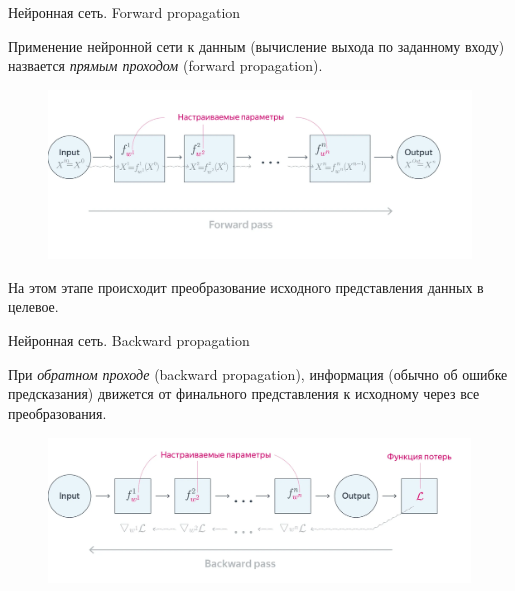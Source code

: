 \documentclass[notheorems, handout, 10pt]{beamer}
\begin{document}
	\begin{frame}{Нейронная сеть. Forward propagation}
		
		Применение нейронной сети к данным (вычисление выхода по заданному входу) назвается \textsl{прямым проходом} (forward propagation).
		
		\begin{figure}[H]
			\includegraphics[width=1\linewidth]{images/2}
		\end{figure}
		
		На этом этапе происходит преобразование исходного представления данных в целевое.
		
		\note{
			
		}
		
	\end{frame}
	
	\begin{frame}{Нейронная сеть. Backward propagation}
		
		При \textsl{обратном проходе} (backward propagation), информация (обычно об ошибке предсказания) движется от финального представления к исходному через все преобразования.
		
		\begin{figure}[H]
			\includegraphics[width=1\linewidth]{images/3}
		\end{figure}
		
		\note{
			
		}
		
	\end{frame}
	
\end{document}
